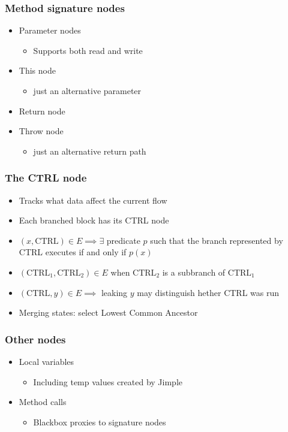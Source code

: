 \documentclass{beamer}
\begin{document}
\begin{frame}
  \frametitle{Method signature nodes}
  \begin{itemize}
    \item Parameter nodes
      \begin{itemize}
        \item Supports both read and write
      \end{itemize}
    \item This node
      \begin{itemize}
        \item just an alternative parameter
      \end{itemize}
    \item Return node
    \item Throw node
      \begin{itemize}
        \item just an alternative return path
      \end{itemize}
  \end{itemize}
\end{frame}

\begin{frame}
  \frametitle{The CTRL node}
  \begin{itemize}
    \item Tracks what data affect the current flow
    \item Each branched block has its CTRL node
    \item $(x, \text{CTRL}) \in E \implies \exists$ predicate $p$ such that
      the branch represented by CTRL executes if and only if $p(x)$
    \item $(\text{CTRL}_1, \text{CTRL}_2) \in E$ when
      $\text{CTRL}_2$ is a subbranch of $\text{CTRL}_1$
    \item $(\text{CTRL}, y) \in E \implies$ leaking $y$ may distinguish hether CTRL was run
    \item Merging states: select Lowest Common Ancestor
  \end{itemize}
\end{frame}

\begin{frame}
  \frametitle{Other nodes}
  \begin{itemize}
    \item Local variables
      \begin{itemize}
        \item Including temp values created by Jimple
      \end{itemize}
    \item Method calls
      \begin{itemize}
        \item Blackbox proxies to signature nodes
      \end{itemize}
  \end{itemize}
\end{frame}
\end{document}
